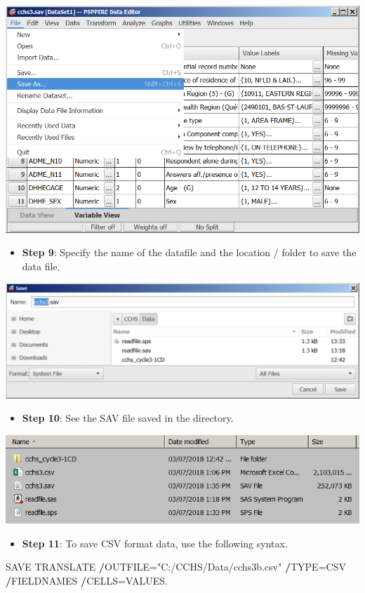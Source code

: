 \documentclass[
]{book}
\newenvironment{Shaded}{\begin{snugshade}}{\end{snugshade}}
\newcommand{\NormalTok}[1]{#1}
\newcommand{\OperatorTok}[1]{\textcolor[rgb]{0.81,0.36,0.00}{\textbf{#1}}}
\newcommand{\StringTok}[1]{\textcolor[rgb]{0.31,0.60,0.02}{#1}}
\providecommand{\tightlist}{%
  \setlength{\itemsep}{0pt}\setlength{\parskip}{0pt}}
\begin{document}
\includegraphics[width=0.65\linewidth]{images/abacus38}

\begin{itemize}
\tightlist
\item
  \textbf{Step 9}: Specify the name of the datafile and the location / folder to save the data file.
\end{itemize}

\includegraphics[width=0.65\linewidth]{images/abacus39}

\begin{itemize}
\tightlist
\item
  \textbf{Step 10}: See the SAV file saved in the directory.
\end{itemize}

\includegraphics[width=0.65\linewidth]{images/abacus40}

\begin{itemize}
\tightlist
\item
  \textbf{Step 11}: To save CSV format data, use the following syntax.
\end{itemize}

\begin{Shaded}
\begin{Highlighting}[]
\NormalTok{SAVE TRANSLATE}
  \OperatorTok{/}\NormalTok{OUTFILE=}\StringTok{"C:/CCHS/Data/cchs3b.csv"}  
  \OperatorTok{/}\NormalTok{TYPE=CSV}
  \OperatorTok{/}\NormalTok{FIELDNAMES      }
  \OperatorTok{/}\NormalTok{CELLS=VALUES.}
\end{Highlighting}
\end{Shaded}
\end{document}
